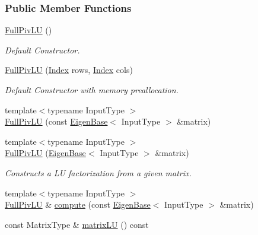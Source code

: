 \subsubsection*{Public Member Functions}
\begin{DoxyCompactItemize}
\item 
\hyperlink{group___l_u___module_af225528d1c6e623a2b1dce091907d13e}{Full\+Piv\+LU} ()
\begin{DoxyCompactList}\small\item\em Default Constructor. \end{DoxyCompactList}\item 
\hyperlink{group___l_u___module_ae83ebd2a24088f04e3ac835b0dc001e1}{Full\+Piv\+LU} (\hyperlink{group___core___module_a554f30542cc2316add4b1ea0a492ff02}{Index} rows, \hyperlink{group___core___module_a554f30542cc2316add4b1ea0a492ff02}{Index} cols)
\begin{DoxyCompactList}\small\item\em Default Constructor with memory preallocation. \end{DoxyCompactList}\item 
{\footnotesize template$<$typename Input\+Type $>$ }\\\hyperlink{group___l_u___module_a31a6a984478a9f721f367667fe4c5ab1}{Full\+Piv\+LU} (const \hyperlink{group___core___module_struct_eigen_1_1_eigen_base}{Eigen\+Base}$<$ Input\+Type $>$ \&matrix)
\item 
{\footnotesize template$<$typename Input\+Type $>$ }\\\hyperlink{group___l_u___module_a3e903b9f401e3fc5d1ca7c6951c76185}{Full\+Piv\+LU} (\hyperlink{group___core___module_struct_eigen_1_1_eigen_base}{Eigen\+Base}$<$ Input\+Type $>$ \&matrix)
\begin{DoxyCompactList}\small\item\em Constructs a LU factorization from a given matrix. \end{DoxyCompactList}\item 
{\footnotesize template$<$typename Input\+Type $>$ }\\\hyperlink{group___l_u___module_class_eigen_1_1_full_piv_l_u}{Full\+Piv\+LU} \& \hyperlink{group___l_u___module_a0a3c3b1bbafa31a03567a4573ebabc79}{compute} (const \hyperlink{group___core___module_struct_eigen_1_1_eigen_base}{Eigen\+Base}$<$ Input\+Type $>$ \&matrix)
\item 
const Matrix\+Type \& \hyperlink{group___l_u___module_afea0b8fc707a9097d46fe358cb18bbff}{matrix\+LU} () const
\item 

\end{DoxyCompactItemize}
